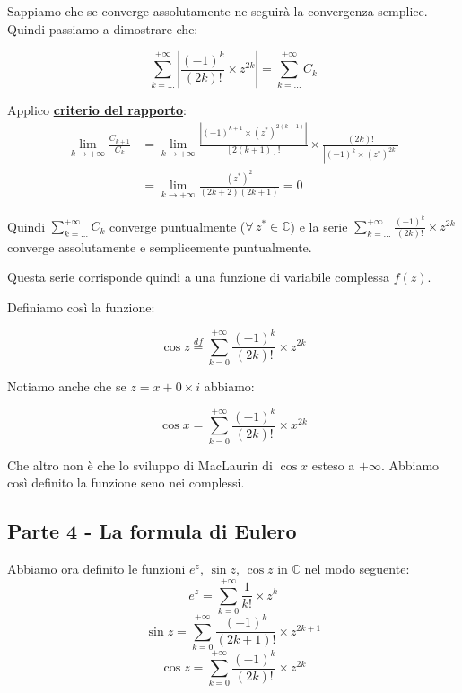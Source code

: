 \documentclass[../../analisi1]{subfiles}
\begin{document}
                Sappiamo che se converge assolutamente ne seguirà la convergenza semplice. Quindi passiamo a dimostrare che:

                \[  \sum_{k=\dots}^{+\infty} \left| \frac{(-1)^k}{(2k)!} \times z^{2k} \right| = \sum_{k=\dots}^{+\infty} C_k \]

                Applico \textbf{\hyperref[criterioRapportoSerie]{criterio del rapporto}}:
                \begin{align*}
                    \lim_{k \to +\infty} \frac{C_{k+1}}{C_k} &= \lim_{k \to +\infty} \frac{\left| (-1)^{k+1} \times (z^*)^{2(k+1)}\right|}{\left[2(k+1)\right]!} \times \frac{\left(2k\right)!}{\left| (-1)^k \times (z^*)^{2k}\right|} \\
                    &= \lim_{k \to +\infty} \frac{(z^*)^2}{(2k+2)(2k+1)} = 0
                \end{align*}

                Quindi \(\sum_{k=\dots}^{+\infty} C_k\) converge puntualmente (\(\forall \, z^* \in \mathbb{C}\)) 
                e la serie  \(\sum_{k=\dots}^{+\infty} \frac{(-1)^k}{(2k)!} \times z^{2k}\) converge assolutamente e semplicemente puntualmente.

                Questa serie corrisponde quindi a una funzione di variabile complessa \(f(z)\).

                Definiamo così la funzione:

                \[  \cos z \stackrel{df}{=} \sum_{k=0}^{+\infty} \frac{(-1)^k}{(2k)!} \times z^{2k}    \]

                Notiamo anche che se \(z = x + 0 \times i\) abbiamo:

                \[  \cos x = \sum_{k=0}^{+\infty} \frac{(-1)^k}{(2k)!} \times x^{2k} \]

                Che altro non è che lo sviluppo di MacLaurin di \(\cos x\) esteso a \(+\infty\). 
                Abbiamo così definito la funzione seno nei complessi.

            \subsection*{Parte 4 - \textbf{La formula di Eulero}}

                Abbiamo ora definito le funzioni \(e^z\), \(\sin z\), \(\cos z\) in \(\mathbb{C}\) nel modo seguente:
                \[  e^z  =  \sum_{k=0}^{+\infty} \frac{1}{k!} \times z^k    \]
                \[  \sin z = \sum_{k=0}^{+\infty} \frac{(-1)^k}{(2k+1)!} \times z^{2k+1} \]
                \[  \cos z = \sum_{k=0}^{+\infty} \frac{(-1)^k}{(2k)!} \times z^{2k}    \]
\end{document}
